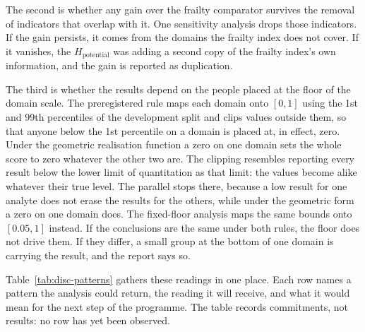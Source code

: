 The second is whether any gain over the frailty comparator survives the removal of
indicators that overlap with it. One sensitivity analysis drops those indicators.
If the gain persists, it comes from the domains the frailty index does not cover.
If it vanishes, the $H_{\text{potential}}$ was adding a second copy of the frailty
index's own information, and the gain is reported as duplication.

The third is whether the results depend on the people placed at the floor of the
domain scale. The preregistered rule maps each domain onto $[0,1]$ using the 1st
and 99th percentiles of the development split and clips values outside them, so
that anyone below the 1st percentile on a domain is placed at, in effect, zero.
Under the geometric realisation function a zero on one domain sets the whole score
to zero whatever the other two are. The clipping resembles reporting every result
below the lower limit of quantitation as that limit: the values become alike
whatever their true level. The parallel stops there, because a low result for one
analyte does not erase the results for the others, while under the geometric form
a zero on one domain does. The fixed-floor analysis maps the same bounds
onto $[0.05,1]$ instead. If the conclusions are the same under both rules, the
floor does not drive them. If they differ, a small group at the bottom of one
domain is carrying the result, and the report says so.

Table~\ref{tab:disc-patterns} gathers these readings in one place. Each row names
a pattern the analysis could return, the reading it will receive, and what it
would mean for the next step of the programme. The table records commitments, not
results: no row has yet been observed.

